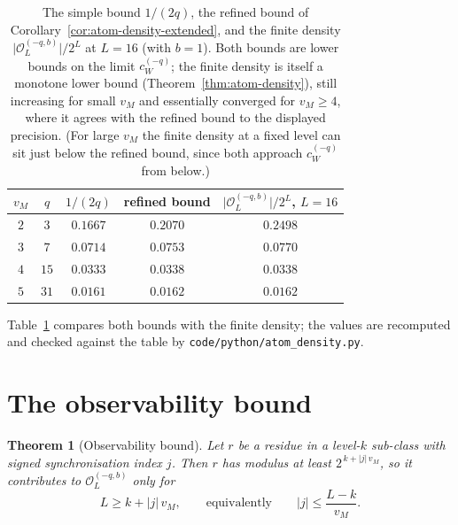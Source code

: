 \documentclass[11pt,reqno]{amsart}
\theoremstyle{plain}
\newtheorem{theorem}{Theorem}[section]
\theoremstyle{definition}
\theoremstyle{remark}
\newcommand{\Obs}{\mathcal{O}}
\newcommand{\vM}{v_{M}}
\newcommand{\cWq}{c_{W}^{(-q)}}
\newcommand{\Obsq}{\Obs_{L}^{(-q,b)}}
\newcommand{\srcpath}[1]{\nolinkurl{#1}}
\begin{document}
\begin{table}[t]
\centering
\renewcommand{\arraystretch}{1.15}
\begin{tabular}{ccccc}
\toprule
$\vM$ & $q$ & $1/(2q)$ & refined bound & $\lvert\Obsq\rvert/2^L$, $L = 16$ \\
\midrule
$2$ & $3$  & $0.1667$ & $0.2070$ & $0.2498$ \\
$3$ & $7$  & $0.0714$ & $0.0753$ & $0.0770$ \\
$4$ & $15$ & $0.0333$ & $0.0338$ & $0.0338$ \\
$5$ & $31$ & $0.0161$ & $0.0162$ & $0.0162$ \\
\bottomrule
\end{tabular}
\caption{The simple bound $1/(2q)$, the refined bound of
Corollary~\ref{cor:atom-density-extended}, and the finite density
$\lvert\Obsq\rvert/2^L$ at $L = 16$ (with $b = 1$). Both bounds are lower
bounds on the limit $\cWq$; the finite density is itself a monotone lower
bound (Theorem~\ref{thm:atom-density}), still increasing for small $\vM$ and
essentially converged for $\vM \ge 4$, where it agrees with the refined bound
to the displayed precision. (For large $\vM$ the finite density at a fixed
level can sit just below the refined bound, since both approach $\cWq$ from
below.)}
\label{tab:density}
\end{table}

Table~\ref{tab:density} compares both bounds with the finite density; the
values are recomputed and checked against the table by
\srcpath{code/python/atom\_density.py}.

\section{The observability bound}\label{sec:jbound}

\begin{theorem}[Observability bound]\label{thm:j-bound}
Let $r$ be a residue in a level-$k$ sub-class with signed synchronisation
index $j$. Then $r$ has modulus at least
$2^{\,k + \lvert j \rvert\, \vM}$, so it contributes to $\Obsq$ only for
\[
L \ge k + \lvert j \rvert\, \vM, \qquad \text{equivalently} \qquad
\lvert j \rvert \le \frac{L - k}{\vM} .
\]
\end{theorem}
\end{document}
